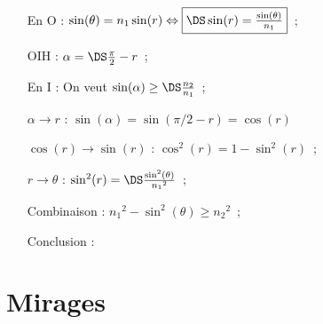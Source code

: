\documentclass[a4paper, 12pt, final, garamond]{book}
\begin{document}
\begin{multicols}{2}
    \begin{itemize}
        \item[En O] : $\sin(\theta) = n_1\sin(r) \Leftrightarrow \fbox{$\DS\sin(r) =
            \frac{\sin(\theta)}{n_1}$}$~;
        \item[OIH] : $\alpha = \DS \frac{\pi}{2} - r$~;
        \item[En I] : On veut $\sin(\alpha) \geq \DS\frac{n_2}{n_1}$~;
        \item[$\alpha\rightarrow r$] : $\sin(\alpha) = \sin(\pi/2 -r) =
            \cos(r)$\\
    \end{itemize}
    \columnbreak
    \begin{itemize}[leftmargin=100pt]
        \item[$\cos(r)\rightarrow\sin(r)$] : $\cos^2(r) = 1-\sin^2(r)$~;
        \item[$r\rightarrow\theta$] : $\sin^2(r) = \DS
            \frac{\sin^2(\theta)}{n_1{}^2}$~;
        \item[Combinaison] : $n_1{}^2 - \sin^2(\theta) \geq n_2{}^2$~;
        \item[Conclusion] : 
    \end{itemize}
\end{multicols}

\section{Mirages}
\end{document}
